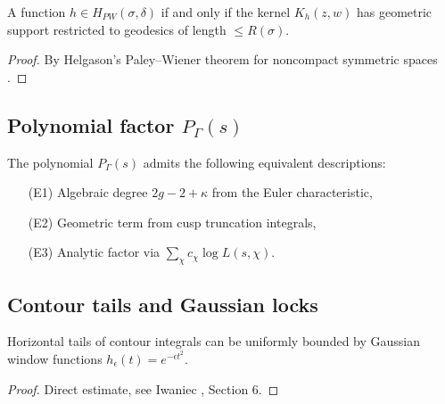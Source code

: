 \begin{lemma}
\label{lem:PW-geo}
A function $h\in H_{PW}(\sigma,\delta)$ 
if and only if the kernel $K_h(z,w)$ has geometric support
restricted to geodesics of length $\leq R(\sigma)$.
\end{lemma}

\begin{proof}
By Helgason’s Paley–Wiener theorem for noncompact symmetric spaces 
\cite{Helgason1970}.
\end{proof}

\subsection{Polynomial factor $P_\Gamma(s)$}

\begin{theorem}
\label{thm:poly-triple}
The polynomial $P_\Gamma(s)$ admits the following equivalent descriptions:
\begin{enumerate}
\item[(E1)] Algebraic degree $2g-2+\kappa$ from the Euler characteristic,
\item[(E2)] Geometric term from cusp truncation integrals,
\item[(E3)] Analytic factor via $\sum_\chi c_\chi\log L(s,\chi)$.
\end{enumerate}
\end{theorem}

\subsection{Contour tails and Gaussian locks}

\begin{lemma}
\label{lem:tail-lock}
Horizontal tails of contour integrals can be uniformly bounded 
by Gaussian window functions $h_\epsilon(t)=e^{-\epsilon t^2}$.
\end{lemma}

\begin{proof}
Direct estimate, see Iwaniec \cite{Iwaniec2002}, Section 6.
\end{proof}

